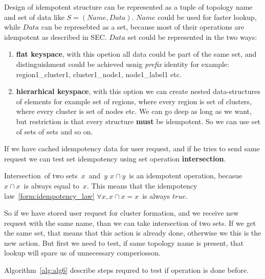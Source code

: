 Design of idempotent structure can be represented as a tuple of topology name and set of data like $S=(Name, Data)$. $Name$ could be used for faster lookup, while $Data$ can be represebted as a set, because most of their operations are idempotent as described in SEC. $Data$ set could be represented in the two ways:

\begin{enumerate}[start=1,label={(\bfseries \arabic*)}]
	\item \textbf{flat keyspace}, with this opetion all data could be part of the same set, and distinguishment could be achieved usnig \textit{prefix} identity for example: region1\_cluster1, cluster1\_node1, node1\_label1 etc.
	\item \textbf{hierarhical keyspace}, with this option we can create nested data-structures of elements for example set of regions, where every region is set of clusters, where every cluster is set of nodes etc. We can go deep as long as we want, but restriction is that every structure \textbf{must} be idempotent. So we can use set of sets of sets and so on.
\end{enumerate}

If we have cached idempotency data for user request, and if he tries to send same request we can test set idempotency using set operation \textbf{intersection}.

\begin{definition}
	Intersection of two sets $x$ and $y$ $x \cap y$ is an idempotent operation, becasue $x \cap x$ is always equal to $x$. This means that the idempotency law~\ref{form:idempotency_law} $\forall x, x \cap x = x$ is always $true$.
\end{definition}

So if we have stored user request for cluster formation, and we receive new request with the same name, than we can take intersection of two sets. If we get the same set, that means that this action is already done, otherwise we this is the new action. But first we need to test, if same topology name is present, that lookup will spare us of unnecessary comperiosson. 

Algorithm~\ref{alg:alg6} describe steps requred to test if operation is done before.
\begin{algorithm}
	\Indm{}\\
	\Indp
\end{algorithm}


